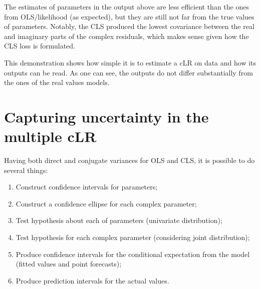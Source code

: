 \documentclass[
]{book}
\providecommand{\tightlist}{%
  \setlength{\itemsep}{0pt}\setlength{\parskip}{0pt}}
\begin{document}
The estimates of parameters in the output above are less efficient than the ones from OLS/likelihood (as expected), but they are still not far from the true values of parameters. Notably, the CLS produced the lowest covariance between the real and imaginary parts of the complex residuals, which makes sense given how the CLS loss is formulated.

This demonstration shows how simple it is to estimate a cLR on data and how its outputs can be read. As one can see, the outputs do not differ substantially from the ones of the real values models.

\hypertarget{capturing-uncertainty-in-the-multiple-clr}{%
\section{Capturing uncertainty in the multiple cLR}\label{capturing-uncertainty-in-the-multiple-clr}}

Having both direct and conjugate variances for OLS and CLS, it is possible to do several things:

\begin{enumerate}
\def\labelenumi{\arabic{enumi}.}
\tightlist
\item
  Construct confidence intervals for parameters;
\item
  Construct a confidence ellipse for each complex parameter;
\item
  Test hypothesis about each of parameters (univariate distribution);
\item
  Test hypothesis for each complex parameter (considering joint distribution);
\item
  Produce confidence intervals for the conditional expectation from the model (fitted values and point forecasts);
\item
  Produce prediction intervals for the actual values.
\end{enumerate}
\end{document}
